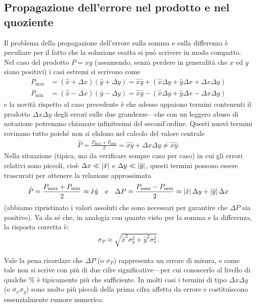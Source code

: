 \subsection{Propagazione dell'errore nel prodotto e nel quoziente}

Il problema della propagazione dell'errore sulla somma e sulla differenza
è peculiare per il fatto che la soluzione esatta si può scrivere in
modo compatto.
Nel caso del prodotto $P = xy$ (assumendo, senza perdere in generalità che
$x$ ed $y$ siano positivi) i casi estremi si scrivono come
\begin{align*}
  P_{\max} &= (\hat{x} + \Delta x)(\hat{y} + \Delta y) =
  \hat{x}\hat{y} + (\hat{x}\Delta y + \hat{y}\Delta x + \Delta x\Delta y)\\
  P_{\min} &= (\hat{x} - \Delta x)(\hat{y} - \Delta y) =
  \hat{x}\hat{y} - (\hat{x}\Delta y + \hat{y}\Delta x - \Delta x\Delta y)
\end{align*}
e la novità rispetto al caso precedente è che adesso appaiono termini
contenenti il prodotto $\Delta x\Delta y$ degli errori sulle due
grandezze---che con un leggero abuso di notazione potremmo chiamare
infinitesimi del second'ordine. Questi nuovi termini rovinano tutto poiché
non si elidono nel calcolo del valore centrale
\begin{align*}
  \hat{P} = \frac{P_{\max} + P_{\min}}{2} = \hat{x}\hat{y} + \Delta x\Delta y
  \neq \hat{x}\hat{y}.
\end{align*}
Nella situazione (tipica, ma da verificare sempre caso per caso) in cui gli
errori relativi sono piccoli, cioè $\Delta x \ll \left| \hat{x} \right|$ e
$\Delta y \ll \left| \hat{y} \right|$, questi termini possono essere trascurati per
ottenere la relazione approssimata
\begin{align}\label{eq:errore_max_prodotto}
  \hat{P} = \frac{P_{\max} + P_{\min}}{2} \approx \hat{x}\hat{y}
  \quad \text{e} \quad
  \Delta P = \frac{P_{\max} - P_{\min}}{2} \approx
  \left| \hat{x} \right|\Delta y + \left| \hat{y} \right|\Delta x
\end{align}
(abbiamo ripristinato i valori assoluti che sono necessari per garantire che
$\Delta P$ sia positivo).
Va da sé che, in analogia con quanto visto per la somma e la differenza,
la risposta corretta è:
\begin{align}
  \sigma_P \approx \sqrt{\hat{x}^2 \sigma_y^2 + \hat{y}^2 \sigma_x^2}.
\end{align}

Vale la pena ricordare che $\Delta P$ (o $\sigma_P$) rappresenta un errore di
misura, e come tale non si scrive con più di due cifre significative---per
cui conoscerlo al livello di qualche \% è tipicamente più che sufficiente.
In molti casi i termini di tipo $\Delta x\Delta y$ (o $\sigma_x\sigma_y$) sono
molto più piccoli della prima cifra affetta da errore e costituiscono
essenzialmente rumore numerico.


